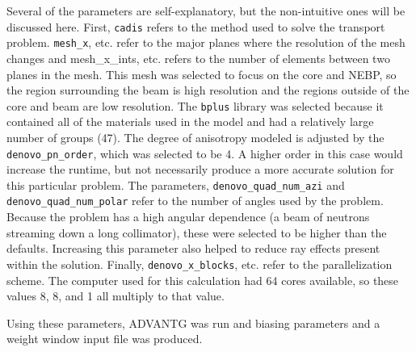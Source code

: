 Several of the parameters are self-explanatory, but the non-intuitive ones will be discussed here.
First, {\tt cadis} refers to the method used to solve the transport problem.
{\tt mesh\_x}, etc. refer to the major planes where the resolution of the mesh changes and {mesh\_x\_ints}, etc. refers to the number of elements between two planes in the mesh.
This mesh was selected to focus on the core and NEBP, so the region surrounding the beam is high resolution and the regions outside of the core and beam are low resolution.
The {\tt bplus} library was selected because it contained all of the materials used in the model and had a relatively large number of groups (47).
The degree of anisotropy modeled is adjusted by the {\tt denovo\_pn\_order}, which was selected to be 4.
A higher order in this case would increase the runtime, but not necessarily produce a more accurate solution for this particular problem.
The parameters, {\tt denovo\_quad\_num\_azi} and {\tt denovo\_quad\_num\_polar} refer to the number of angles used by the problem.
Because the problem has a high angular dependence (a beam of neutrons streaming down a long collimator), these were selected to be higher than the defaults.
Increasing this parameter also helped to reduce ray effects present within the solution.
Finally, {\tt denovo\_x\_blocks}, etc. refer to the parallelization scheme.
The computer used for this calculation had 64 cores available, so these values 8, 8, and 1 all multiply to that value.

Using these parameters, ADVANTG was run and biasing parameters and a weight window input file was produced.

